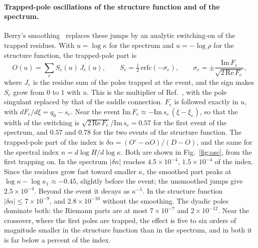 \documentclass[floatfix,aps,pre,preprint,superscriptaddress,nofootinbib,amsmath,amssymb]{revtex4-2}
\begin{document}
\paragraph*{Trapped-pole oscillations of the structure function and of the spectrum.}
Berry's smoothing~\cite{Berry1988} replaces these jumps by an analytic switching-on of the trapped residues. With
$u=\log\kappa$ for the spectrum and $u=-\log\rho$ for the structure function, the trapped-pole part is
\begin{equation}
    O(u)=\sum_e S_e(u)\,J_e(u),\qquad S_e=\tfrac12\,\mathrm{erfc}(-\sigma_e),\qquad
    \sigma_e=\pm\frac{\mathrm{Im}\,F_e}{\sqrt{2\,\mathrm{Re}\,F_e}},
    \label{eq:Berry}
\end{equation}
where $J_e$ is the residue sum of the poles trapped at the event, and the sign makes $S_e$ grow from $0$ to $1$ with $u$.
This is the multiplier of Ref.~\cite{migdal2026Riemann}, with the pole singulant replaced by that of the saddle
connection. $F_e$ is followed exactly in $u$, with $dF_e/d\xi=q_0-s_e$. Near the event
$\mathrm{Im}\,F_e\approx-\mathrm{Im}\,s_e\,(\xi-\xi_e)$, so that the width of the switching is
$\sqrt{2\,\mathrm{Re}\,F_e}/\mathrm{Im}\,s_e=0.57$ for the first event of the spectrum, and $0.57$ and $0.78$ for the two
events of the structure function. The trapped-pole part of the index is $\delta\alpha=(O'-\alpha O)/(D-O)$, and the same
for the spectral index $n=d\log H/d\log\kappa$. Both are shown in Fig.~\ref{fig:osc}, from the first trapping on. In the
spectrum $|\delta n|$ reaches $4.5\times10^{-4}$, $1.5\times10^{-4}$ of the index. Since the residues grow fast toward
smaller $\kappa$, the smoothed part peaks at $\log\kappa-\log\kappa_1\approx-0.45$, slightly before the event; the
unsmoothed jumps give $2.5\times10^{-4}$. Beyond the event it decays as $\kappa^{-5}$. In the structure function
$|\delta\alpha|\le7\times10^{-9}$, and $2.8\times10^{-10}$ without the smoothing. The dyadic poles dominate both: the
Riemann parts are at most $7\times10^{-7}$ and $2\times10^{-12}$. Near the crossover, where the first poles are trapped, the
effect is five to six orders of magnitude smaller in the structure function than in the spectrum, and in both it is far
below a percent of the index.
\end{document}
